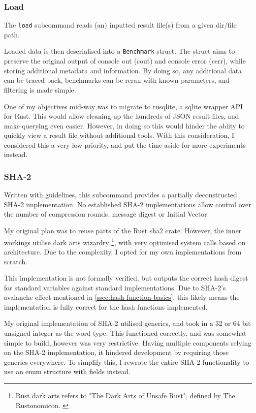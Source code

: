 \documentclass[a4paper]{report}
\begin{document}
\subsubsection{Load}
\label{ssec:load}
The \texttt{load} subcommand reads (an) inputted result file(s) from a given dir/file path.

Loaded data is then deserialised into a \texttt{Benchmark} struct.
The struct aims to preserve the original output of console out (cout) and console error (cerr), while storing additional metadata and information.
By doing so, any additional data can be traced back, benchmarks can be reran with known parameters, and filtering is made simple.

One of my objectives mid-way was to migrate to rusqlite, a sqlite wrapper API for Rust. \cite{cargo:rusqlite}
This would allow cleaning up the hundreds of JSON result files, and make querying even easier.
However, in doing so this would hinder the ablity to quickly view a result file without additional tools.
With this consideration, I considered this a very low priority, and put the time aside for more experiments instead.

\subsubsection{SHA-2}
Written with \cite{NIST_SP_180_4} guidelines, this subcommand provides a partially deconstructed SHA-2 implementation.
No established SHA-2 implementations allow control over the number of compression rounds, message digest or Initial Vector.

My original plan was to reuse parts of the Rust sha2 crate. \cite{cargo:sha2}
However, the inner workings utilise dark arts wizardry
\footnote{Rust dark arts refers to "The Dark Arts of Unsafe Rust", defined by The Rustonomicon. \cite{rustonomicon}},
with very optimised system calls based on architecture.
Due to the complexity, I opted for my own implementations from scratch.

This implementation is not formally verified, but outputs the correct hash digest for standard variables against standard implementations.
Due to SHA-2's avalanche effect mentioned in \ref{ssec:hash-function-basics}, this likely means the implementation is fully correct for the hash functions implemented.

My original implementation of SHA-2 utilised generics, and took in a 32 or 64 bit unsigned integer as the word type.
This functioned correctly, and was somewhat simple to build, however was very restrictive.
Having multiple components relying on the SHA-2 implementation, it hindered development by requiring those generics everywhere.
To simplify this, I rewrote the entire SHA-2 functionality to use an enum structure with fields instead.
\end{document}

